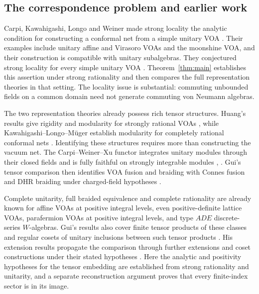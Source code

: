 \documentclass[11pt]{article}
\numberwithin{equation}{section}
\theoremstyle{definition}
\theoremstyle{remark}
\begin{document}
\subsection{The correspondence problem and earlier work}

Carpi, Kawahigashi, Longo and Weiner made strong locality the analytic condition for constructing a conformal net from a simple unitary VOA \cite[Theorems~6.8 and~8.1]{CKLW}. Their examples include unitary affine and Virasoro VOAs and the moonshine VOA, and their construction is compatible with unitary subalgebras. They conjectured strong locality for every simple unitary VOA \cite[Conjecture~8.18]{CKLW}. Theorem~\ref{thm:main} establishes this assertion under strong rationality and then compares the full representation theories in that setting. The locality issue is substantial: commuting unbounded fields on a common domain need not generate commuting von Neumann algebras.

The two representation theories already possess rich tensor structures. Huang's results give rigidity and modularity for strongly rational VOAs \cite{HuangTensor,HuangRigidity}, while Kawahigashi--Longo--M\"uger establish modularity for completely rational conformal nets \cite{KLM}. Identifying these structures requires more than constructing the vacuum net. The Carpi--Weiner--Xu functor integrates unitary modules through their closed fields and is fully faithful on strongly integrable modules \cite[Theorem~4.3]{GuiUnitaryII}, \cite[Theorem~4.24]{GuiExtensions}. Gui's tensor comparison then identifies VOA fusion and braiding with Connes fusion and DHR braiding under charged-field hypotheses \cite[Corollary~3.23]{GuiUnbounded}.

Complete unitarity, full braided equivalence and complete rationality are already known for affine VOAs at positive integral levels, even positive-definite lattice VOAs, parafermion VOAs at positive integral levels, and type $ADE$ discrete-series $W$-algebras. Gui's results also cover finite tensor products of these classes and regular cosets of unitary inclusions between such tensor products \cite[Theorem~I]{GuiUnbounded}. His extension results propagate the comparison through further extensions and coset constructions under their stated hypotheses \cite[Theorem~6.18 and Example~6.19]{GuiExtensions}. Here the analytic and positivity hypotheses for the tensor embedding are established from strong rationality and unitarity, and a separate reconstruction argument proves that every finite-index sector is in its image.
\end{document}
